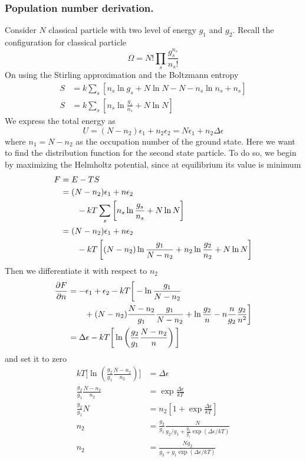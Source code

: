 \documentclass[../../../Main.tex]{subfiles}
\begin{document}
\subsubsection{Population number derivation.} Consider $N$ classical particle with two level of energy $g_1$ and $g_2$. Recall the configuration for classical particle
\begin{equation*}
    \Omega=N!\prod_s \frac{g_s^{n_s}}{n_s!}
\end{equation*}
On using the Stirling approximation and the Boltzmann entropy
\begin{align*}
    S&=k\sum_s\left[n_s\ln g_s+N\ln N-N-n_s\ln n_s+n_s\right]\\
    S&=k\sum_s\left[n_s\ln \frac{g_s}{n_s}+N\ln N\right]
\end{align*}
We express the total energy as 
\begin{equation*}
    U=(N-n_2)\epsilon_1+n_2\epsilon_2=N\epsilon_1+n_2\Delta\epsilon
\end{equation*}
where $n_1=N-n_2$ as the occupation number of the ground state. Here we want to find the distribution function for the second state particle. To do so, we begin by maximizing the Helmholtz potential, since at equilibrium its value is minimum
\begin{align*}
    F&=E-TS\\
    &=(N-n_2)\epsilon_1+n\epsilon_2\notag\\
    &\qquad-kT\sum_s\left[n_s\ln \frac{g_s}{n_s}+N\ln N\right]\\
    &=(N-n_2)\epsilon_1+n\epsilon_2\notag\\
    &\qquad-kT\left[(N-n_2)\ln \frac{g_1}{N-n_2}+n_2\ln\frac{g_2}{n_2}+N\ln N\right]
\end{align*}
Then we differentiate it with respect to $n_2$ 
\begin{align*}
    \frac{\partial F}{\partial n}&=-\epsilon_1+\epsilon_2 -kT\bigg[-\ln\frac{g_1}{N-n_2}\notag\\
    &\qquad+(N-n_2)\frac{N-n_2}{g_1}\frac{g_1}{N-n_2} +\ln\frac{g_2}{n} -n\frac{n}{g_2}\frac{g_2}{n^2}\bigg]\\
    &=\Delta\epsilon-kT\bigg[\ln\left(\frac{g_2}{g_1}\frac{N-n_2}{n}\right)\bigg]\label{eq:dFdn}
\end{align*}
and set it to zero
\begin{align*}
    kT\bigg[\ln\left(\frac{g_2}{g_1}\frac{N-n_2}{n_2}\right)\bigg]&=\Delta\epsilon\\
    \frac{g_2}{g_1}\frac{N-n_2}{n_2}&=\exp \frac{\Delta\epsilon}{kT}\\
    \frac{g_2}{g_1}N&=n_2\left[1+\exp \frac{\Delta\epsilon}{kT}\right]\\
    n_2&=\frac{g_2}{g_1}\frac{N}{g_2/g_1+\frac{g_2}{g_1}\exp(\Delta\epsilon/kT)}\\
    n_2&=\frac{Ng_2}{g_2+g_1\exp(\Delta\epsilon/kT)}
\end{align*}
\end{document}
